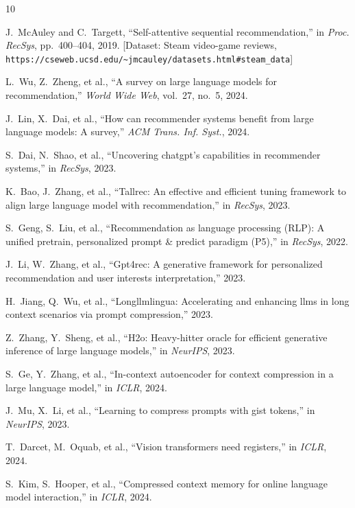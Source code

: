 \documentclass[lettersize,journal]{IEEEtran}
\begin{document}
\begin{thebibliography}{10}

J.~McAuley and C.~Targett, ``Self-attentive sequential recommendation,'' in \emph{Proc. RecSys}, pp.~400--404, 2019. [Dataset: Steam video-game reviews, \texttt{https://cseweb.ucsd.edu/\textasciitilde{}jmcauley/datasets.html\#steam\_data}]

L.~Wu, Z.~Zheng, et al., ``A survey on large language models for recommendation,'' \emph{World Wide Web}, vol.~27, no.~5, 2024.

J.~Lin, X.~Dai, et al., ``How can recommender systems benefit from large language models: A survey,'' \emph{ACM Trans. Inf. Syst.}, 2024.

S.~Dai, N.~Shao, et al., ``Uncovering chatgpt's capabilities in recommender systems,'' in \emph{RecSys}, 2023.

K.~Bao, J.~Zhang, et al., ``Tallrec: An effective and efficient tuning framework to align large language model with recommendation,'' in \emph{RecSys}, 2023.

S.~Geng, S.~Liu, et al., ``Recommendation as language processing (RLP): A unified pretrain, personalized prompt \& predict paradigm (P5),'' in \emph{RecSys}, 2022.

J.~Li, W.~Zhang, et al., ``Gpt4rec: A generative framework for personalized recommendation and user interests interpretation,'' 2023.

H.~Jiang, Q.~Wu, et al., ``Longllmlingua: Accelerating and enhancing llms in long context scenarios via prompt compression,'' 2023.

Z.~Zhang, Y.~Sheng, et al., ``H2o: Heavy-hitter oracle for efficient generative inference of large language models,'' in \emph{NeurIPS}, 2023.

S.~Ge, Y.~Zhang, et al., ``In-context autoencoder for context compression in a large language model,'' in \emph{ICLR}, 2024.

J.~Mu, X.~Li, et al., ``Learning to compress prompts with gist tokens,'' in \emph{NeurIPS}, 2023.

T.~Darcet, M.~Oquab, et al., ``Vision transformers need registers,'' in \emph{ICLR}, 2024.

S.~Kim, S.~Hooper, et al., ``Compressed context memory for online language model interaction,'' in \emph{ICLR}, 2024.


\end{thebibliography}
\end{document}
